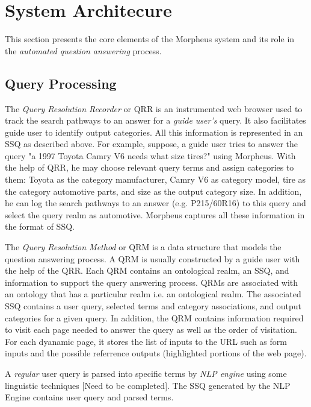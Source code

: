\section{System Architecure}
\label{sec:systemarch}

This section presents the core elements of the Morpheus system and its 
role in the \textit{automated question answering} process. 

\subsection{Query Processing}
  
The \textit{Query Resolution Recorder} or QRR is an instrumented web browser used to
track the search pathways to an answer for a \textit{guide user's} query. It
also facilitates guide user to identify output categories. All this information
is represented in an SSQ as described above. For example, suppose, a guide user tries to answer the query "a 1997 Toyota Camry V6 needs what size tires?" using Morpheus. With the help of QRR, he may choose relevant query terms and assign categories to them: Toyota as the category manufacturer, Camry V6 as category model, tire as the category automotive parts, and size as the output category size. In addition, he can log the search pathways to an answer (e.g. P215/60R16) to this query and select the query realm as automotive. Morpheus captures all these information in the format of SSQ.     


The \textit{Query Resolution Method} or QRM is a data structure that models the question answering process. A QRM is usually constructed by a guide user with the help of the QRR. Each QRM contains an ontological realm, an SSQ, and information to support the query answering process. QRMs are associated with an ontology that
has a particular realm i.e. an ontological realm. The associated SSQ contains a
user query, selected terms and category associations, and output categories for
a given query. In addition, the QRM contains information required to visit each
page needed to answer the query as well as the order of visitation. For each
dyanamic page, it stores the list of inputs to the URL such as form inputs and
the possible referrence outputs (highlighted portions of the web page).


A \textit{regular} user query is parsed into specific terms by \textit{NLP engine} using
some linguistic techniques [Need to be completed]. The SSQ generated by the NLP
Engine contains user query and parsed terms. 


